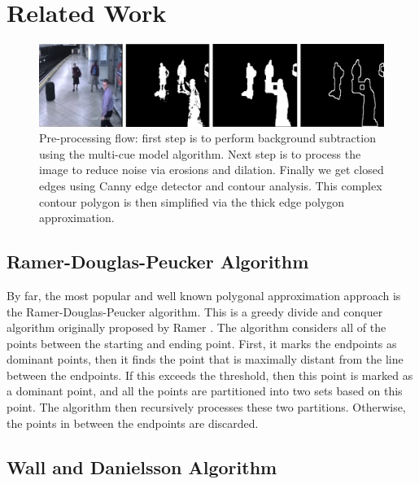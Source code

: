 \documentclass[10pt,twocolumn,letterpaper]{article}
\begin{document}

\section{Related Work}

\begin{figure}
	\includegraphics[width=\textwidth]{images/vision_pipeline}
    \caption{Pre-processing flow: first step is to perform background subtraction using the multi-cue model algorithm.
            Next step is to process the image to reduce noise via erosions and dilation. Finally we get closed edges
            using Canny edge detector and contour analysis. This complex contour polygon is then simplified via the
            thick edge polygon approximation.}
	\label{fig:pipeline}
\end{figure}

\subsection{Ramer-Douglas-Peucker Algorithm}

By far, the most popular and well known polygonal approximation approach is the Ramer-Douglas-Peucker algorithm. This is
a greedy divide and conquer algorithm originally proposed by Ramer \cite{Ramer1972}. The algorithm considers all of the
points between the starting and ending point. First, it marks the endpoints as dominant points, then it finds the point
that is maximally distant from the line between the endpoints. If this exceeds the threshold, then this point is marked
as a dominant point, and all the points are partitioned into two sets based on this point. The algorithm then
recursively processes these two partitions. Otherwise, the points in between the endpoints are discarded.

\subsection{Wall and Danielsson Algorithm}
\end{document}
